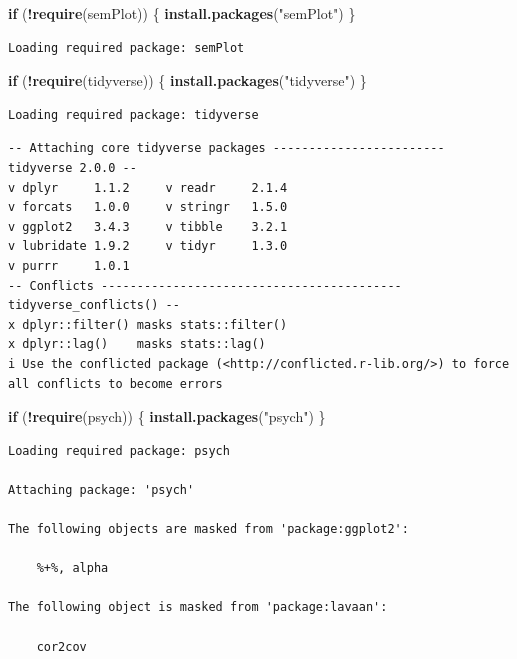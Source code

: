 \documentclass[
  11pt,
]{book}
\newenvironment{Shaded}{\begin{snugshade}}{\end{snugshade}}
\newcommand{\ControlFlowTok}[1]{\textcolor[rgb]{0.27,0.27,0.27}{\textbf{#1}}}
\newcommand{\FunctionTok}[1]{\textcolor[rgb]{0.27,0.27,0.27}{\textbf{#1}}}
\newcommand{\NormalTok}[1]{#1}
\newcommand{\SpecialCharTok}[1]{\textcolor[rgb]{0.43,0.43,0.43}{\textbf{#1}}}
\newcommand{\StringTok}[1]{\textcolor[rgb]{0.5,0.5,0.5}{#1}}
\begin{document}
\begin{Shaded}
\begin{Highlighting}[]
\ControlFlowTok{if}\NormalTok{ (}\SpecialCharTok{!}\FunctionTok{require}\NormalTok{(semPlot)) \{}
    \FunctionTok{install.packages}\NormalTok{(}\StringTok{"semPlot"}\NormalTok{)}
\NormalTok{\}}
\end{Highlighting}
\end{Shaded}

\begin{verbatim}
Loading required package: semPlot
\end{verbatim}

\begin{Shaded}
\begin{Highlighting}[]
\ControlFlowTok{if}\NormalTok{ (}\SpecialCharTok{!}\FunctionTok{require}\NormalTok{(tidyverse)) \{}
    \FunctionTok{install.packages}\NormalTok{(}\StringTok{"tidyverse"}\NormalTok{)}
\NormalTok{\}}
\end{Highlighting}
\end{Shaded}

\begin{verbatim}
Loading required package: tidyverse
\end{verbatim}

\begin{verbatim}
-- Attaching core tidyverse packages ------------------------ tidyverse 2.0.0 --
v dplyr     1.1.2     v readr     2.1.4
v forcats   1.0.0     v stringr   1.5.0
v ggplot2   3.4.3     v tibble    3.2.1
v lubridate 1.9.2     v tidyr     1.3.0
v purrr     1.0.1     
-- Conflicts ------------------------------------------ tidyverse_conflicts() --
x dplyr::filter() masks stats::filter()
x dplyr::lag()    masks stats::lag()
i Use the conflicted package (<http://conflicted.r-lib.org/>) to force all conflicts to become errors
\end{verbatim}

\begin{Shaded}
\begin{Highlighting}[]
\ControlFlowTok{if}\NormalTok{ (}\SpecialCharTok{!}\FunctionTok{require}\NormalTok{(psych)) \{}
    \FunctionTok{install.packages}\NormalTok{(}\StringTok{"psych"}\NormalTok{)}
\NormalTok{\}}
\end{Highlighting}
\end{Shaded}

\begin{verbatim}
Loading required package: psych

Attaching package: 'psych'

The following objects are masked from 'package:ggplot2':

    %+%, alpha

The following object is masked from 'package:lavaan':

    cor2cov
\end{verbatim}
\end{document}
